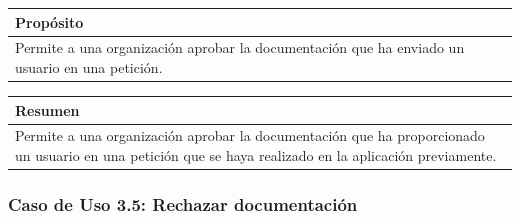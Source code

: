 \begin{table}[H]
    \centering
    \begin{tabularx}{\textwidth}{@{} |L |@{}} \hline
        \textbf{Propósito} \\
        \hline
        Permite a una organización aprobar la documentación que ha enviado un usuario en una petición. \\
        \hline
    \end{tabularx}
\end{table}

\begin{table}[H]
    \centering
    \begin{tabularx}{\textwidth}{@{} |L |@{}} \hline
        \textbf{Resumen} \\
        \hline
        Permite a una organización aprobar la documentación que ha proporcionado un usuario en una petición que se haya
    realizado en la aplicación previamente. \\
        \hline
    \end{tabularx}
\end{table}

\subsubsection{Caso de Uso 3.5: Rechazar documentación}\label{subsubsec:rechazar-documentacion}

